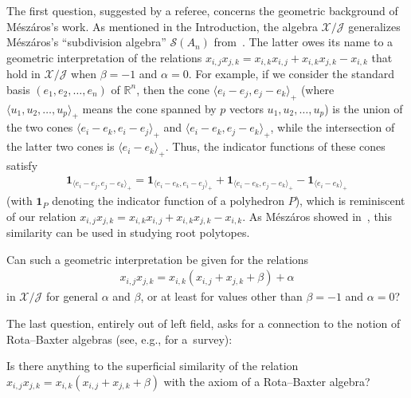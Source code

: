 \documentclass[pdftex]{sigma}
\numberwithin{equation}{section}
\begin{document}
The first question, suggested by a referee, concerns the geometric background of M\'{e}sz\'{a}ros's work. As mentioned in the Introduction, the algebra $\mathcal{X}/\mathcal{J}$ generalizes M\'{e}sz\'{a}ros's ``subdivision algebra'' $\mathcal{S}(A_{n}) $ from~\cite{Meszar09}. The latter owes its name to a geometric interpretation of the relations $x_{i,j}x_{j,k}=x_{i,k}x_{i,j}+x_{i,k}x_{j,k}-x_{i,k}$ that hold in $\mathcal{X}/\mathcal{J}$ when $\beta=-1$ and $\alpha=0$. For example, if we consider the standard basis $( e_{1},e_{2},\ldots,e_{n})$ of $\mathbb{R}^{n}$, then the cone $ \langle e_{i}-e_{j},e_{j}-e_{k}\rangle _{+}$ (where $\langle u_{1},u_{2},\ldots,u_{p}\rangle _{+}$ means the cone spanned by $p$ vectors $u_{1},u_{2},\ldots,u_{p}$) is the union of the two cones $\langle e_{i}-e_{k},e_{i}-e_{j}\rangle _{+}$ and $\langle e_{i}-e_{k},e_{j}-e_{k}\rangle _{+}$, while the intersection of the latter two cones is $\langle e_{i}-e_{k}\rangle _{+}$. Thus, the indicator
functions of these cones satisfy
\begin{gather*}
\mathbf{1}_{\langle e_{i}-e_{j},e_{j}-e_{k}\rangle _{+}}=\mathbf{1}_{\langle e_{i}-e_{k},e_{i}-e_{j}\rangle _{+}
}+\mathbf{1}_{\langle e_{i}-e_{k},e_{j}-e_{k}\rangle _{+}}-\mathbf{1}_{\langle e_{i}-e_{k}\rangle _{+}}%
\end{gather*}
(with $\mathbf{1}_{P}$ denoting the indicator function of a polyhedron $P$), which is reminiscent of our relation $x_{i,j}x_{j,k} =x_{i,k}x_{i,j}+x_{i,k}x_{j,k}-x_{i,k}$. As M\'{e}sz\'{a}ros showed in~\cite{Meszar09}, this similarity can be used in studying root polytopes.

\begin{question}
Can such a geometric interpretation be given for the relations
\begin{gather*}
x_{i,j} x_{j,k}=x_{i,k} ( x_{i,j}+x_{j,k}+\beta ) +\alpha
\end{gather*}
in $\mathcal{X}/\mathcal{J}$ for general $\alpha$ and $\beta$, or at least for values other than $\beta=-1$ and $\alpha=0$?
\end{question}

The last question, entirely out of left field, asks for a connection to the notion of Rota--Baxter algebras (see, e.g., \cite{Guo09} for a~survey):

\begin{question}Is there anything to the superficial similarity \cite{Grinbe18} of the relation $x_{i,j}x_{j,k}=x_{i,k} ( x_{i,j}+x_{j,k}+\beta ) $ with the axiom of a Rota--Baxter algebra?
\end{question}
\end{document}
